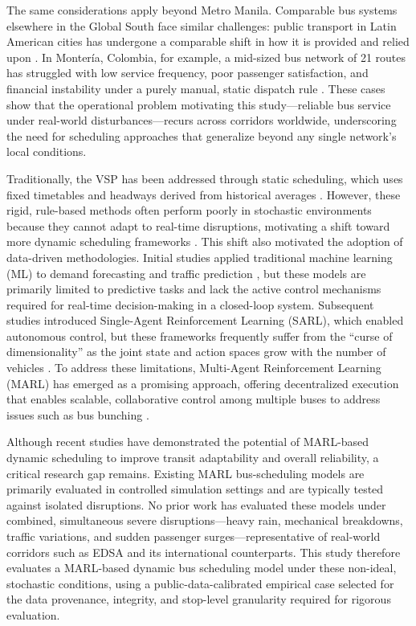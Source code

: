 The same considerations apply beyond Metro Manila. Comparable bus systems elsewhere in the Global South face similar challenges: public transport in Latin American cities has undergone a comparable shift in how it is provided and relied upon \cite{Tironi2018}. In Monter\'ia, Colombia, for example, a mid-sized bus network of 21 routes has struggled with low service frequency, poor passenger satisfaction, and financial instability under a purely manual, static dispatch rule \cite{Barrera2025Optimization}. These cases show that the operational problem motivating this study---reliable bus service under real-world disturbances---recurs across corridors worldwide, underscoring the need for scheduling approaches that generalize beyond any single network's local conditions.

Traditionally, the VSP has been addressed through static scheduling, which uses fixed timetables and headways derived from historical averages \cite{Ceder2007}. However, these rigid, rule-based methods often perform poorly in stochastic environments because they cannot adapt to real-time disruptions, motivating a shift toward more dynamic scheduling frameworks \cite{Ollero2024EDSA}. This shift also motivated the adoption of data-driven methodologies. Initial studies applied traditional machine learning (ML) to demand forecasting and traffic prediction \cite{Wang2017}, but these models are primarily limited to predictive tasks and lack the active control mechanisms required for real-time decision-making in a closed-loop system. Subsequent studies introduced Single-Agent Reinforcement Learning (SARL), which enabled autonomous control, but these frameworks frequently suffer from the ``curse of dimensionality'' as the joint state and action spaces grow with the number of vehicles \cite{Chen2024Survey}. To address these limitations, Multi-Agent Reinforcement Learning (MARL) has emerged as a promising approach, offering decentralized execution that enables scalable, collaborative control among multiple buses to address issues such as bus bunching \cite{Wang2020Holding}.

Although recent studies have demonstrated the potential of MARL-based dynamic scheduling to improve transit adaptability and overall reliability, a critical research gap remains. Existing MARL bus-scheduling models are primarily evaluated in controlled simulation settings and are typically tested against isolated disruptions. No prior work has evaluated these models under combined, simultaneous severe disruptions---heavy rain, mechanical breakdowns, traffic variations, and sudden passenger surges---representative of real-world corridors such as EDSA and its international counterparts. This study therefore evaluates a MARL-based dynamic bus scheduling model under these non-ideal, stochastic conditions, using a public-data-calibrated empirical case selected for the data provenance, integrity, and stop-level granularity required for rigorous evaluation.

